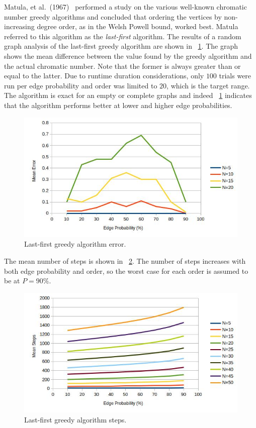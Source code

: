Matula, et al.~(1967)~\cite{matula} performed a study on the various well-known chromatic number greedy algorithms
and concluded that ordering the vertices by non-increasing degree order, as in the Welsh Powell bound, worked best.
Matula referred to this algorithm as the \emph{last-first} algorithm.  The results of a random graph analysis of
the last-first greedy algorithm are shown in \figurename~\ref{fig:greedy:error}.  The graph shows the mean
difference between the value found by the greedy algorithm and the actual chromatic number.  Note that the former
is always greater than or equal to the latter.  Due to runtime duration considerations, only \(100\) trials were
run per edge probability and order was limited to \(20\), which is the target range.  The algorithm is exact for an
empty or complete graphs and indeed \figurename~\ref{fig:greedy:error} indicates that the algorithm performs better
at lower and higher edge probabilities.

\begin{figure}[H]
  \centering
  \includegraphics[width=5in]{greedy_error}
  \caption{Last-first greedy algorithm error.}
  \label{fig:greedy:error}
\end{figure}

The mean number of steps is shown in \figurename~\ref{fig:greedy:steps}.  The number of steps increases with both
edge probability and order, so the worst case for each order is assumed to be at \(P=90\%\).

\begin{figure}[H]
  \centering
  \includegraphics[width=5in]{greedy_steps}
  \caption{Last-first greedy algorithm steps.}
  \label{fig:greedy:steps}
\end{figure}

